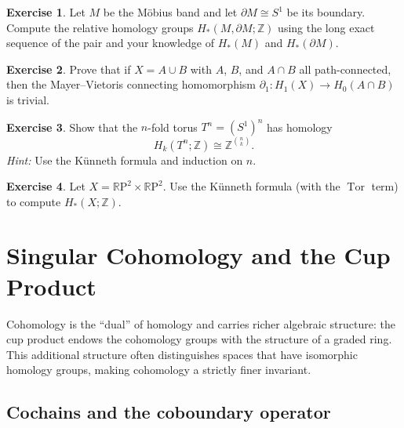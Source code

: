 \documentclass[12pt,a4paper,openany]{book}
\theoremstyle{definition}
\newtheorem{exercise}{Exercise}[chapter]
\theoremstyle{plain}
\theoremstyle{remark}
\newcommand{\Z}{\mathbb{Z}}
\newcommand{\RP}{\mathbb{R}\mathrm{P}}
\begin{document}
\begin{exercise}
Let $M$ be the M\"obius band and let $\partial M\cong S^1$ be its
boundary. Compute the relative homology groups $H_*(M,\partial M;\Z)$
using the long exact sequence of the pair and your knowledge of
$H_*(M)$ and $H_*(\partial M)$.
\end{exercise}

\begin{exercise}
Prove that if $X=A\cup B$ with $A$, $B$, and $A\cap B$ all
path-connected, then the Mayer--Vietoris connecting homomorphism
$\partial_1\colon H_1(X)\to H_0(A\cap B)$ is trivial.
\end{exercise}

\begin{exercise}
Show that the $n$-fold torus $T^n = (S^1)^n$ has homology
\[
  H_k(T^n;\Z) \cong \Z^{\binom{n}{k}}.
\]
\textit{Hint:} Use the K\"unneth formula and induction on $n$.
\end{exercise}

\begin{exercise}
Let $X=\RP^2\times\RP^2$. Use the K\"unneth formula (with the
$\operatorname{Tor}$ term) to compute $H_*(X;\Z)$.
\end{exercise}


\chapter{Singular Cohomology and the Cup Product}\label{ch:cohomology}

Cohomology is the ``dual'' of homology and carries richer algebraic
structure: the cup product endows the cohomology groups with the
structure of a graded ring. This additional structure often distinguishes
spaces that have isomorphic homology groups, making cohomology a strictly
finer invariant.

\section{Cochains and the coboundary operator}
\label{sec:cochains}
\end{document}
